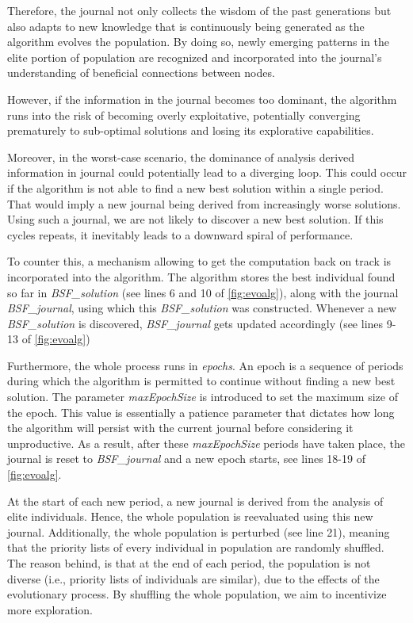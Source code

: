 \documentclass[twoside]{ctuthesis}
\theoremstyle{plain}
\theoremstyle{definition}
\theoremstyle{note}
\begin{document}
Therefore, the journal not only collects the wisdom of the past generations but also adapts to new knowledge that is continuously being generated as the algorithm evolves the population. By doing so, newly emerging patterns in the elite portion of population are recognized and incorporated into the journal's understanding of beneficial connections between nodes. 

However, if the information in the journal becomes too dominant, the algorithm runs into the risk of becoming overly exploitative, potentially converging prematurely to sub-optimal solutions and losing its explorative capabilities. 

Moreover, in the worst-case scenario, the dominance of analysis derived information in journal could potentially lead to a diverging loop. This could occur if the algorithm is not able to find a new best solution within a single period. That would imply a new journal being derived from increasingly worse solutions. Using such a journal, we are not likely to discover a new best solution. If this cycles repeats, it inevitably leads to a downward spiral of performance.

To counter this, a mechanism allowing to get the computation back on track is incorporated into the algorithm. The algorithm stores the best individual found so far in \emph{BSF\_solution} (see lines 6 and 10 of \ref{fig:evoalg}), along with the journal \emph{BSF\_journal}, using which this \emph{BSF\_solution} was constructed. Whenever a new \emph{BSF\_solution} is discovered, \emph{BSF\_journal} gets updated accordingly (see lines 9-13 of \ref{fig:evoalg})

Furthermore, the whole process runs in \emph{epochs}. An epoch is a sequence of periods during which the algorithm is permitted to continue without finding a new best solution. The parameter \emph{maxEpochSize} is introduced to set the maximum size of the epoch. This value is essentially a patience parameter that dictates how long the algorithm will persist with the current journal before considering it unproductive. As a result, after these \emph{maxEpochSize} periods have taken place, the journal is reset to \emph{BSF\_journal} and a new epoch starts, see lines 18-19 of \ref{fig:evoalg}.

At the start of each new period, a new journal is derived from the analysis of elite individuals. Hence, the whole population is reevaluated using this new journal. Additionally, the whole population is perturbed (see line 21), meaning that the priority lists of every individual in population are randomly shuffled. The reason behind, is that at the end of each period, the population is not diverse (i.e., priority lists of individuals are similar), due to the effects of the evolutionary process. By shuffling the whole population, we aim to incentivize more exploration.
\end{document}
